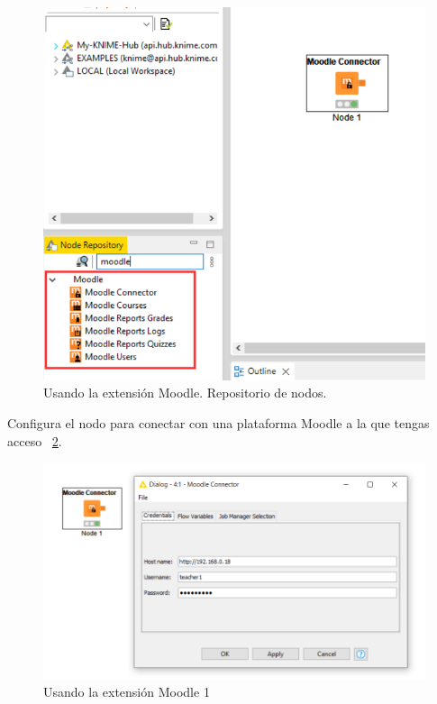 \begin{figure}[!htb]
	\centering
	\includegraphics[width=1\textwidth]{img/manual_usuario_node_repository.png}
	\caption{Usando la extensión Moodle. Repositorio de nodos. }
	\label{fig:extension0}
\end{figure}
\FloatBarrier

Configura el nodo para conectar con una plataforma Moodle a la que tengas acceso ~\ref{fig:extension1}. 
\

\begin{figure}[!htb]
	\centering
	\includegraphics[width=1\textwidth]{img/manual_usuario_moodle_connector.png}
	\caption{Usando la extensión Moodle 1}
	\label{fig:extension1}
\end{figure}
\FloatBarrier

